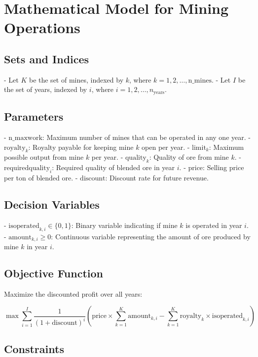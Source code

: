 \documentclass{article}
\begin{document}
\section*{Mathematical Model for Mining Operations}

\subsection*{Sets and Indices}

- Let \( K \) be the set of mines, indexed by \( k \), where \( k = 1, 2, \ldots, \text{n\_mines} \).
- Let \( I \) be the set of years, indexed by \( i \), where \( i = 1, 2, \ldots, n_{\text{years}} \).

\subsection*{Parameters}

- \( \text{n\_maxwork} \): Maximum number of mines that can be operated in any one year.
- \( \text{royalty}_k \): Royalty payable for keeping mine \( k \) open per year.
- \( \text{limit}_k \): Maximum possible output from mine \( k \) per year.
- \( \text{quality}_k \): Quality of ore from mine \( k \).
- \( \text{requiredquality}_i \): Required quality of blended ore in year \( i \).
- \( \text{price} \): Selling price per ton of blended ore.
- \( \text{discount} \): Discount rate for future revenue.

\subsection*{Decision Variables}

- \( \text{isoperated}_{k,i} \in \{0, 1\} \): Binary variable indicating if mine \( k \) is operated in year \( i \).
- \( \text{amount}_{k,i} \geq 0 \): Continuous variable representing the amount of ore produced by mine \( k \) in year \( i \).

\subsection*{Objective Function}

Maximize the discounted profit over all years:

\[
\max \sum_{i=1}^{I} \frac{1}{(1 + \text{discount})^i} \left( \text{price} \times \sum_{k=1}^{K} \text{amount}_{k,i} - \sum_{k=1}^{K} \text{royalty}_k \times \text{isoperated}_{k,i} \right)
\]

\subsection*{Constraints}
\end{document}
